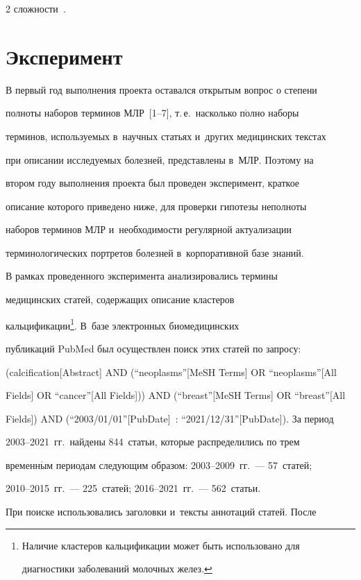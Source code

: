 \begin{multicols}{2}
{сложности}~\cite{14-zz, 19-zz}.



\section{Эксперимент}



  В первый год выполнения проекта оставался открытым вопрос о степени 

полноты наборов терминов МЛР~[1--7], т.\,е.\ насколько п$\acute{\mbox{о}}$лно наборы 

терминов, используемых в~научных статьях и~других медицинских текстах 

при описании исследуемых болезней, представлены в~МЛР. Поэтому на 

втором году выполнения проекта был проведен эксперимент, краткое 

описание которого приведено ниже, для проверки гипотезы неполноты 

наборов терминов МЛР и~необходимости регулярной актуализации 

терминологических портретов болезней в~корпоративной базе знаний.

  

  В рамках проведенного эксперимента анализировались термины 

медицинских статей, содержащих описание кластеров 

кальцификации\footnote{Наличие кластеров кальцификации может быть использовано для 

диагностики заболеваний молочных желез.}. В~базе электронных биомедицинских 

публикаций PubMed был осуществлен поиск этих статей по запросу: 

(calcification[Abstract] AND (``neoplasms''[MeSH Terms] OR ``neoplasms''[All 

Fields] OR ``cancer''[All Fields])) AND (``breast''[MeSH Terms] OR ``breast''[All 

Fields]) AND (``2003/01/01''[PubDate]~: ``2021/12/31''[PubDate]). За период 

2003--2021~гг.\ найдены 844~статьи, которые распределились по трем 

временн$\acute{\mbox{ы}}$м периодам следующим образом: 2003--2009~гг.~--- 57~статей; 

2010--2015~гг.~--- 225~статей; 2016--2021~гг.~--- 562~статьи.

  

  При поиске использовались заголовки и~текс\-ты аннотаций статей. После 


\end{multicols}
